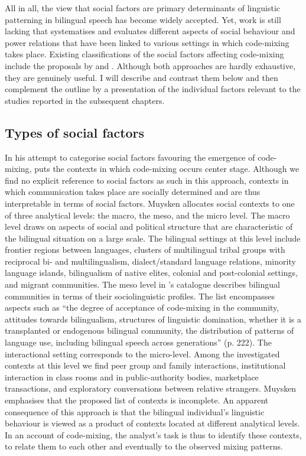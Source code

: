 All in all, the view that social factors are primary determinants of linguistic patterning in bilingual speech has become widely accepted. Yet, work is still lacking that systematises and evaluates different aspects of social behaviour and power relations that have been linked to various settings in which code-mixing takes place. Existing classifications of the social factors affecting code-mixing include the proposals by \citet{muysken-bilingual-2000} and \citet{gardner-chloros_code-switching_2009}. Although both approaches are hardly exhaustive, they are genuinely useful. I will  describe and contrast them below and then complement the outline by a presentation of the individual factors relevant to the studies reported in the subsequent chapters.

\subsection{Types of social factors}
In his attempt to categorise social factors favouring the emergence of code-mixing, \citet[][222--223]{muysken-bilingual-2000} puts the contexts in which code-mixing occurs center stage. Although we find no explicit reference to social factors as such in this approach, contexts in which communication takes place are socially determined and are thus interpretable in terms of social factors. Muysken allocates social contexts to one of three analytical levels: the macro, the meso, and the micro level. The macro level draws on aspects of social and political structure that are characteristic of the bilingual situation on a large scale. The bilingual settings at this level include frontier regions between languages, clusters of multilingual tribal groups with reciprocal bi- and multilingualism, dialect/standard language relations, minority language islands, bilingualism of native elites, colonial and post-colonial settings, and migrant communities. The meso level in \citeauthor{muysken-bilingual-2000}'s catalogue describes bilingual communities in terms of their sociolinguistic profiles. The list encompasses aspects such as ``the degree of acceptance of code-mixing in the community, attitudes towards bilingualism, structures of linguistic domination, whether it is a transplanted or endogenous bilingual community, the distribution of patterns of language use, including bilingual speech across generations'' (p. 222). The interactional setting corresponds to the micro-level. Among the investigated contexts at this level we find peer group and family interactions, institutional interaction in class rooms and in public-authority bodies, marketplace transactions, and exploratory conversations between relative strangers. Muysken emphasises that the proposed list of contexts is incomplete. An apparent consequence of this approach is that the bilingual individual's linguistic behaviour is viewed as a product of contexts located at different analytical levels. In an account of code-mixing, the analyst's task is thus to identify these contexts, to relate them to each other and eventually to the observed mixing patterns.

